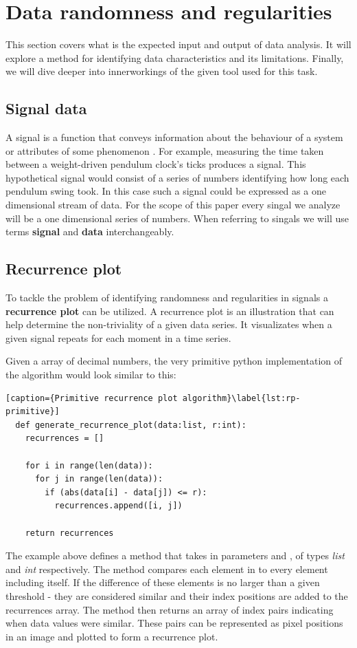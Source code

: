 \documentclass[a4paper,12pt,fleqn]{article}
\begin{document}
\section{Data randomness and regularities}
This section covers what is the expected input and output of data analysis.
It will explore a method for identifying data characteristics and its limitations.
Finally, we will dive deeper into innerworkings of the given tool used for this task.


\subsection{Signal data}
A signal is a function that conveys information about the behaviour of a system or attributes of some phenomenon \cite{priemer1990introductory}.
For example, measuring the time taken between a weight-driven
pendulum clock's ticks produces a signal.
This hypothetical signal would consist of a series of numbers identifying how long each pendulum swing took.
In this case such a signal could be expressed as a one dimensional stream of data.
For the scope of this paper every singal we analyze will be a one dimensional series of numbers.
When referring to singals we will use terms \textbf{signal} and \textbf{data} interchangeably.

\subsection{Recurrence plot}
To tackle the problem of identifying randomness and regularities in signals a \textbf{recurrence plot} can be utilized.
A recurrence plot is an illustration that can help determine the non-triviality of a given data series.
It visualizates when a given signal repeats for each moment in a time series.

Given a  array of decimal numbers, the very primitive python implementation of the algorithm would look similar to this:
\begin{lstlisting}[caption={Primitive recurrence plot algorithm}\label{lst:rp-primitive}]
  def generate_recurrence_plot(data:list, r:int):
    recurrences = []
    
    for i in range(len(data)):
      for j in range(len(data)):
        if (abs(data[i] - data[j]) <= r):
          recurrences.append([i, j])

    return recurrences
\end{lstlisting}
The example above defines a method  that takes in parameters  and , of types \emph{list} and \emph{int} respectively.
The method compares each element in  to every element including itself.
If the difference of these elements is no larger than a given threshold  - they are considered similar and their index positions are added to the recurrences array.
The method then returns an array of index pairs indicating when data values were similar.
These pairs can be represented as pixel positions in an image and plotted to form a recurrence plot.
\end{document}
